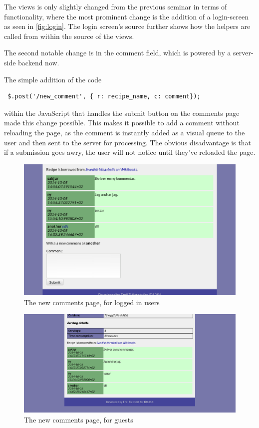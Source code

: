 \documentclass[a4paper]{scrartcl}
\begin{document}
The views is only slightly changed from the previous seminar in terms of functionality, where the most prominent change is the addition of a login-screen as seen in \ref{fig:login}. The login screen's source further shows how the helpers are called from within the source of the views.



The second notable change is in the comment field, which is powered by a server-side backend now. 

The simple addition of the code
\begin{lstlisting}
 $.post('/new_comment', { r: recipe_name, c: comment});
\end{lstlisting}
within the JavaScript that handles the submit button on the comments page made this change possible. This makes it possible to add a comment without reloading the page, as the comment is instantly added as a visual queue to the user and then sent to the server for processing. The obvious disadvantage is that if a submission goes awry, the user will not notice until they've reloaded the page.


\begin{figure}[!h]
  \begin{center}
    \includegraphics[scale=0.3]{comments.png}
    \caption{The new comments page, for logged in users}
    \label{fig:comments}
  \end{center}
\end{figure}

\begin{figure}[!h]
  \begin{center}
    \includegraphics[scale=0.3]{comments_no_login.png}
    \caption{The new comments page, for guests}
    \label{fig:commentsguest}
  \end{center}
\end{figure}
\end{document}
